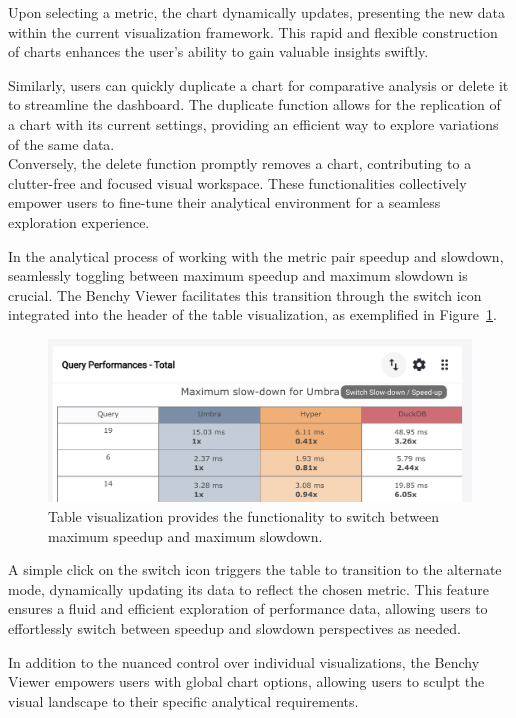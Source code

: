 Upon selecting a metric, the chart dynamically updates, presenting the new data within the current visualization framework. This rapid and flexible construction of charts enhances the user's ability to gain valuable insights swiftly.

Similarly, users can quickly duplicate a chart for comparative analysis or delete it to streamline the dashboard. The duplicate function allows for the replication of a chart with its current settings, providing an efficient way to explore variations of the same data.\\
Conversely, the delete function promptly removes a chart, contributing to a clutter-free and focused visual workspace. These functionalities collectively empower users to fine-tune their analytical environment for a seamless exploration experience.

In the analytical process of working with the metric pair speedup and slowdown, seamlessly toggling between maximum speedup and maximum slowdown is crucial. The Benchy Viewer facilitates this transition through the switch icon integrated into the header of the table visualization, as exemplified in Figure~\ref{fig:chart-configuration-table-switch}.

\begin{figure}[h]
  \centering
  \includegraphics[width=0.8\linewidth]{figures/chart-configuration-table-switch.png}
  \caption{Table visualization provides the functionality to switch between maximum speedup and maximum slowdown.}
  \label{fig:chart-configuration-table-switch}
\end{figure}

A simple click on the switch icon triggers the table to transition to the alternate mode, dynamically updating its data to reflect the chosen metric. This feature ensures a fluid and efficient exploration of performance data, allowing users to effortlessly switch between speedup and slowdown perspectives as needed.


In addition to the nuanced control over individual visualizations, the Benchy Viewer empowers users with global chart options, allowing users to sculpt the visual landscape to their specific analytical requirements.

